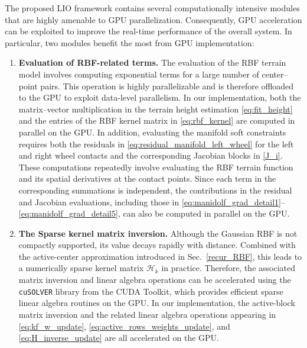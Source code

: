 \documentclass[journal,twoside,web]{ieeecolor}
\begin{document}
The proposed LIO framework contains several computationally intensive modules that are highly amenable to GPU parallelization. Consequently, GPU acceleration can be exploited to improve the real-time performance of the overall system. In particular, two modules benefit the most from GPU implementation:
\begin{enumerate}
    \item \textbf{Evaluation of RBF-related terms.} 
    The evaluation of the RBF terrain model involves computing exponential terms for a large number of center--point pairs. This operation is highly parallelizable and is therefore offloaded to the GPU to exploit data-level parallelism. In our implementation, both the matrix--vector multiplication in the terrain height estimation \eqref{eq:fit_height} and the entries of the RBF kernel matrix in \eqref{eq:rbf_kernel} are computed in parallel on the GPU.
    In addition, evaluating the manifold soft constraints requires both the residuals in \eqref{eq:residual_manifold_left_wheel} for the left and right wheel contacts and the corresponding Jacobian blocks in \eqref{J_i}. These computations repeatedly involve evaluating the RBF terrain function and its spatial derivatives at the contact points. Since each term in the corresponding summations is independent, the contributions in the residual and Jacobian evaluations, including those in \eqref{eq:manidolf_grad_detail1}--\eqref{eq:manidolf_grad_detail5}, can also be computed in parallel on the GPU.

    \item \textbf{The Sparse kernel matrix inversion.} 
    Although the Gaussian RBF is not compactly supported, its value decays rapidly with distance. Combined with the active-center approximation introduced in Sec.~\ref{recur_RBF}, this leads to a numerically sparse kernel matrix $\bm{\mathcal{H}}_k$ in practice. Therefore, the associated matrix inversion and linear algebra operations can be accelerated using the \texttt{cuSOLVER} library from the CUDA Toolkit, which provides efficient sparse linear algebra routines on the GPU. In our implementation, the active-block matrix inversion and the related linear algebra operations appearing in \eqref{eq:kf_w_update}, \eqref{eq:active_rows_weights_update}, and \eqref{eq:H_inverse_update} are all accelerated on the GPU.
\end{enumerate}
\end{document}
